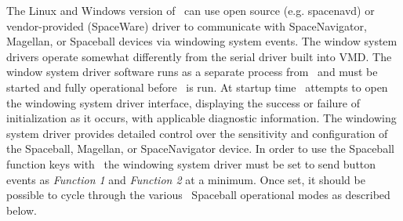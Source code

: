 The Linux and Windows version of \VMD\ can use open source (e.g. spacenavd)
or vendor-provided (SpaceWare) driver to communicate with 
SpaceNavigator, Magellan, or Spaceball devices via windowing system events.  
The window system drivers operate somewhat differently from the 
serial driver built into VMD.  
The window system driver software runs as a separate process
from \VMD\ and must be started and fully operational before \VMD\ is run.
At startup time \VMD\ attempts to open the windowing system driver 
interface, displaying the success or failure of initialization as it occurs, 
with applicable diagnostic information.  The windowing system
driver provides detailed control over the sensitivity and configuration 
of the Spaceball, Magellan, or SpaceNavigator device.  In order to use
the Spaceball function keys with \VMD\, the windowing system driver must be set
to send button events as {\em Function 1} and {\em Function 2} at a minimum.
Once set, it should be possible to cycle through the various \VMD\ Spaceball 
operational modes as described below.


